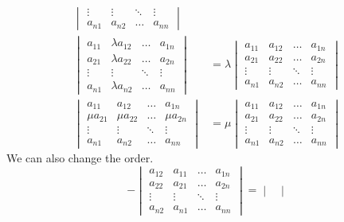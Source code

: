 \documentclass{huhtakm-template-book}
\begin{document}
\begin{defn}
\begin{align*}
\begin{vmatrix}
            \vdots & \vdots & \ddots & \vdots\\
            a_{n1} & a_{n2} & \hdots & a_{nn}
        \end{vmatrix}\\
        \begin{vmatrix}
            a_{11} & \lambda a_{12} & \hdots & a_{1n}\\
            a_{21} & \lambda a_{22} & \hdots & a_{2n}\\
            \vdots & \vdots & \ddots & \vdots\\
            a_{n1} & \lambda a_{n2} & \hdots & a_{nn}
        \end{vmatrix}&=\lambda \begin{vmatrix}
            a_{11} & a_{12} & \hdots & a_{1n}\\
            a_{21} & a_{22} & \hdots & a_{2n}\\
            \vdots & \vdots & \ddots & \vdots\\
            a_{n1} & a_{n2} & \hdots & a_{nn}
        \end{vmatrix}\\
        \begin{vmatrix}
            a_{11} & a_{12} & \hdots & a_{1n}\\
            \mu a_{21} & \mu a_{22} & \hdots & \mu a_{2n}\\
            \vdots & \vdots & \ddots & \vdots\\
            a_{n1} & a_{n2} & \hdots & a_{nn}
        \end{vmatrix}&=\mu \begin{vmatrix}
            a_{11} & a_{12} & \hdots & a_{1n}\\
            a_{21} & a_{22} & \hdots & a_{2n}\\
            \vdots & \vdots & \ddots & \vdots\\
            a_{n1} & a_{n2} & \hdots & a_{nn}
        \end{vmatrix}
    \end{align*}
    We can also change the order.
    \begin{equation*}
        -\begin{vmatrix}
            a_{12} & a_{11} & \hdots & a_{1n}\\
            a_{22} & a_{21} & \hdots & a_{2n}\\
            \vdots & \vdots & \ddots & \vdots\\
            a_{n2} & a_{n1} & \hdots & a_{nn}
        \end{vmatrix}=\begin{vmatrix}

\end{vmatrix}
\end{equation*}
\end{defn}
\end{document}

